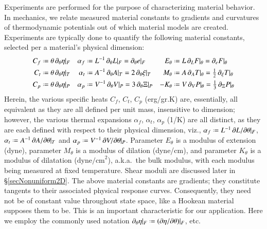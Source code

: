Experiments are performed for the purpose of characterizing material behavior.  In mechanics, we relate measured material constants to gradients and curvatures of thermo\-dynamic potentials out of which material models are created.  Experiments are typically done to quantify the following material constants, selected per a material's physical dimension:
\begin{subequations}
\label{materialConstants}
\begin{align}
C_f & \defeq \theta \, \partial_{\theta} \eta |_F & 
\alpha_f & \defeq L^{-1} \, \partial_{\theta} L |_F = 
\partial_{\theta} e |_F &
E_{\theta} & \defeq L \, \partial_L F |_{\theta} = 
\partial_e F |_{\theta} \\
C_t & \defeq \theta \, \partial_{\theta} \eta |_T & 
\alpha_t & \defeq A^{-1} \, \partial_{\theta} A |_T = 
2 \, \partial_{\theta} \xi |_T &
M_{\theta} & \defeq A \, \partial_A T |_{\theta} = 
\tfrac{1}{2} \, \partial_{\xi} T |_{\theta} \\
C_p & \defeq \theta \, \partial_{\theta} \eta |_P & 
\alpha_p & \defeq V^{-1} \, \partial_{\theta} V |_P = 
3 \, \partial_{\theta} \Xi |_P &
-K_{\theta} & \defeq V \, \partial_V P |_{\theta} = 
\tfrac{1}{3} \, \partial_{\Xi} P |_{\theta}
\end{align}
\end{subequations}
Herein, the various specific heats $C_f$, $C_t$, $C_p$ (erg/gr.K) are, essentially,  all equivalent as they are all defined per unit mass, insensitive to dimension; however, the various thermal expansions $\alpha_f$, $\alpha_t$, $\alpha_p$ (1/K) are all distinct, as they are each defined with respect to their physical dimension, viz., $\alpha_f \defeq L^{-1} \, \partial L / \partial \theta |_F$, $\alpha_t \defeq A^{-1} \, \partial A / \partial \theta |_T$ and $\alpha_p \defeq V^{-1} \, \partial V / \partial \theta |_P$.  Parameter $E_{\theta}$ is a modulus of extension (dyne), parameter $M_{\theta}$ is a modulus of dilation (dyne/cm), and parameter $K_{\theta}$ is a modulus of dilatation ($\mathrm{dyne/cm}^2$), a.k.a.\ the bulk modulus, with each modulus being measured at fixed temperature.  Shear moduli are discussed later in \S\ref{secNonuniform2D}.  The above material constants are gradients; they constitute tangents to their associated physical response curves.  Consequently, they need not be of constant value throughout state space, like a Hookean material supposes them to be.  This is an important characteristic for our application.  Here we employ the commonly used notation $\partial_{\theta} \eta |_F \defeq ( \partial \eta / \partial \theta ) |_F$, etc.

